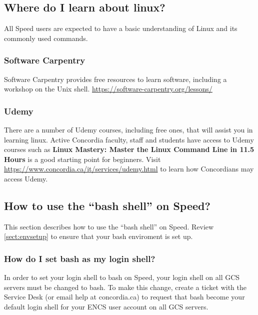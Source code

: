 \documentclass{easychair}
\begin{document}
\subsection{Where do I learn about linux? }
All Speed users are expected to have a basic understanding of Linux and its commonly used commands.
\subsubsection*{Software Carpentry}
Software Carpentry provides free resources to learn software, including a workshop on the Unix shell.
\url{https://software-carpentry.org/lessons/} 

\subsubsection*{Udemy}
There are a number of Udemy courses, including free ones, that will assist you in learning linux. Active Concordia faculty, staff and students have access to Udemy courses such as \textbf{Linux Mastery: Master the Linux Command Line in 11.5 Hours} is a good starting point for beginners. Visit \url{https://www.concordia.ca/it/services/udemy.html} to learn how Concordians may access Udemy.

\subsection{How to use the ``bash shell'' on Speed?}

This section describes how to use the ``bash shell'' on Speed. Review \autoref{sect:envsetup} to ensure that your bash enviroment is set up.

\subsubsection{How do I set bash as my login shell?}
In order to set your login shell to bash on Speed, your login shell on all GCS servers must be changed to bash.
To make this change, create a ticket with the Service Desk (or email help at concordia.ca) to request that bash become your default login shell for your ENCS user account on all GCS servers.
\end{document}
